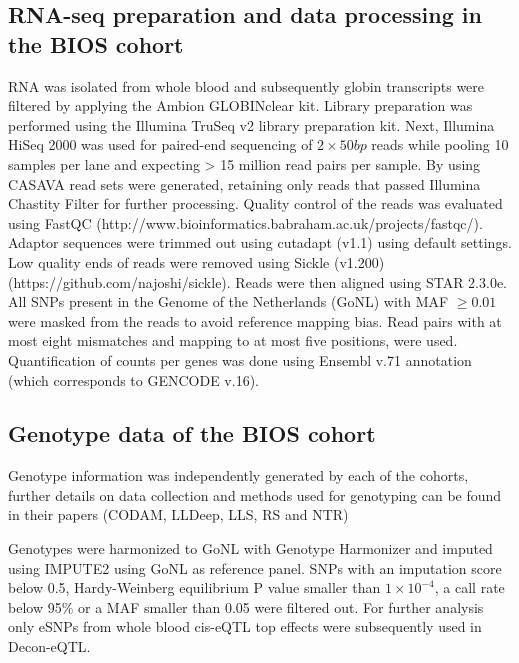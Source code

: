 \subsection{RNA-seq preparation and data processing in the BIOS cohort}
RNA was isolated from whole blood and subsequently globin transcripts were filtered by applying the Ambion GLOBINclear kit. Library preparation was performed using the Illumina TruSeq v2 library preparation kit. Next, Illumina HiSeq 2000 was used for paired-end sequencing of $2 \times 50 bp$ reads while pooling 10 samples per lane and expecting > 15 million read pairs per sample. By using CASAVA read sets were generated, retaining only reads that passed Illumina Chastity Filter for further processing.
Quality control of the reads was evaluated using FastQC (http://www.bioinformatics.babraham.ac.uk/projects/fastqc/). Adaptor sequences were trimmed out using cutadapt (v1.1) using default settings. Low quality ends of reads were removed using Sickle (v1.200) (https://github.com/najoshi/sickle). 
Reads were then aligned using STAR 2.3.0e\cite{dobinSTARUltrafastUniversal2013}. All SNPs present in the Genome of the Netherlands (GoNL) with MAF $\geq 0.01$ were masked from the reads to avoid reference mapping bias. Read pairs with at most eight mismatches and mapping to at most five positions, were used. Quantification of counts per genes was done using Ensembl v.71 annotation (which corresponds to GENCODE v.16).

\subsection{Genotype data of the BIOS cohort}
Genotype information was independently generated by each of the cohorts, further details on data collection and methods used for genotyping can be found in their papers (CODAM\cite{damParentalHistoryDiabetes2001}, LLDeep\cite{tigchelaarCohortProfileLifeLines2015}, LLS\cite{deelenGenomewideAssociationMetaanalysis2014}, RS\cite{hofmanRotterdamStudy20162015} and NTR\cite{willemsenNetherlandsTwinRegister2010})

Genotypes were harmonized to GoNL with Genotype Harmonizer\cite{deelenGenotypeHarmonizerAutomatic2014}  and imputed using IMPUTE2\cite{howieFlexibleAccurateGenotype2009} using GoNL as reference panel. SNPs with an imputation score below 0.5, Hardy-Weinberg equilibrium P value smaller than $1 \times 10^{-4}$, a call rate below 95\% or a MAF smaller than 0.05 were filtered out. For further analysis only eSNPs from whole blood cis-eQTL top effects were subsequently used in Decon-eQTL. 

